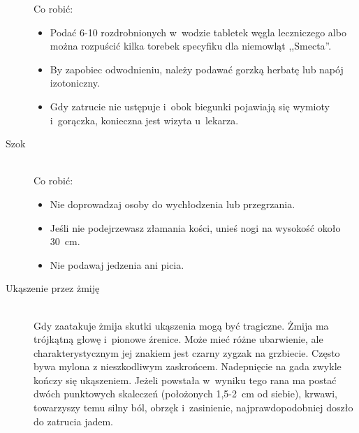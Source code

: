 \documentclass[a5paper,10pt,titlepage,twoside]{article}
\begin{document}
\begin{description}
Co robić:
\begin{itemize}
\item Podać 6-10 rozdrobnionych w~wodzie tabletek węgla leczniczego albo można rozpuścić kilka torebek specyfiku dla niemowląt ,,Smecta''.
\item By zapobiec odwodnieniu, należy podawać gorzką herbatę lub napój izotoniczny.
\item Gdy zatrucie nie ustępuje i~obok biegunki pojawiają się wymioty i~gorączka, konieczna jest wizyta u~lekarza.
\end{itemize} %
\item[Szok] \hfill \\ Co robić:
\begin{itemize}
\item Nie doprowadzaj osoby do wychłodzenia lub przegrzania.
\item Jeśli nie podejrzewasz złamania kości, unieś nogi na wysokość około 30~cm.
\item Nie podawaj jedzenia ani picia.
\end{itemize}
\item[Ukąszenie przez żmiję] \hfill \\ Gdy zaatakuje żmija skutki ukąszenia mogą być tragiczne. Żmija ma trójkątną głowę i~pionowe źrenice. Może mieć różne ubarwienie, ale charakterystycznym jej znakiem jest czarny zygzak na grzbiecie. Często bywa mylona z nieszkodliwym zaskrońcem. Nadepnięcie na gada zwykle kończy się ukąszeniem. Jeżeli powstała w~wyniku tego rana ma postać dwóch punktowych skaleczeń (położonych 1,5-2~cm od siebie), krwawi, towarzyszy temu silny ból, obrzęk i~zasinienie, najprawdopodobniej doszło do zatrucia jadem.


\end{description}
\end{document}

